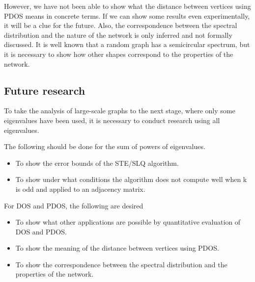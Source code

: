 \documentclass[senior,final,11pt]{iscs-thesis}
\begin{document}
However, we have not been able to show what the distance between vertices using PDOS means in concrete terms. If we can show some results even experimentally, it will be a clue for the future. Also, the correspondence between the spectral distribution and the nature of the network is only inferred and not formally discussed. It is well known that a random graph has a semicircular spectrum, but it is necessary to show how other shapes correspond to the properties of the network.

\subsection*{Future research}
To take the analysis of large-scale graphs to the next stage, where only some eigenvalues have been used, it is necessary to conduct research using all eigenvalues.

The following should be done for the sum of powers of eigenvalues.
\begin{itemize}
    \item To show the error bounds of the STE/SLQ algorithm.
    \item To show under what conditions the algorithm does not compute well when k is odd and applied to an adjacency matrix.
\end{itemize}

For DOS and PDOS, the following are desired
\begin{itemize}
    \item To show what other applications are possible by quantitative evaluation of DOS and PDOS.
    \item To show the meaning of the distance between vertices using PDOS.
    \item To show the correspondence between the spectral distribution and the properties of the network.
\end{itemize}



\appendix
\end{document}

